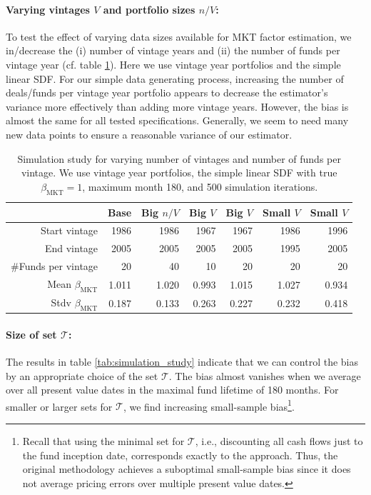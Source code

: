\documentclass[12pt]{article}
\begin{document}
\paragraph{Varying vintages $V$ and portfolio sizes $n/V$:}
To test the effect of varying data sizes available for MKT factor estimation, we in/decrease the (i) number of vintage years and (ii) the number of funds per vintage year (cf. table \ref{tab:simulation_study_size}).
Here we use vintage year portfolios and the simple linear SDF.
For our simple data generating process, increasing the number of deals/funds per vintage year portfolio appears to decrease the estimator's variance more effectively than adding more vintage years.
However, the bias is almost the same for all tested specifications.
Generally, we seem to need many new data points to ensure a reasonable variance of our estimator.

\begin{table}[ht]
	\centering
	\begin{tabular}{rrrrrrr}
		& Base & Big $n/V$ & Big $V$ & Big $V$ & Small $V$ & Small $V$ \\ 
		\hline
		\hline
		Start vintage & 1986 & 1986 & 1967 & 1967 & 1986 & 1996 \\ 
		End vintage & 2005 & 2005 & 2005 & 2005 & 1995 & 2005 \\ 
		\#Funds per vintage & 20 & 40 & 10 & 20 & 20 & 20 \\ 
		\hline
		Mean $\beta_{\mathrm{MKT}}$ & 1.011 & 1.020 & 0.993 & 1.015 & 1.027 & 0.934 \\ 
		Stdv $\beta_{\mathrm{MKT}}$ & 0.187 & 0.133 & 0.263 & 0.227 & 0.232 & 0.418 \\ 
		\hline
		\hline
	\end{tabular}
	\caption{Simulation study for varying  number of vintages and number of funds per vintage. 
		   We use vintage year portfolios, the simple linear SDF with true $\beta_{\mathrm{MKT}}=1$, maximum month 180, and 500 simulation iterations.} 
	\label{tab:simulation_study_size}
\end{table}

\paragraph{Size of set $\mathcal{T}$:}
The results in table \ref{tab:simulation_study} indicate that we can control the bias by an appropriate choice of the set $\mathcal{T}$.
The bias almost vanishes when we average over all present value dates in the maximal fund lifetime of 180 months. 
For smaller or larger sets for $\mathcal{T}$, we find increasing small-sample bias\footnote{Recall that using the minimal set for $\mathcal{T}$, i.e., discounting all cash flows just to the fund inception date, corresponds exactly to the \cite{DLP12} approach. Thus, the original \cite{DLP12} methodology achieves a suboptimal small-sample bias since it does not average pricing errors over multiple present value dates.}.
\end{document}
